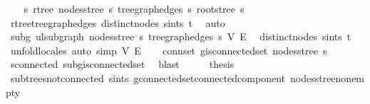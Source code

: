 \begin{isabellebody}
%
\isadelimproof
%
\endisadelimproof
%
\isatagproof
{}\isamarkupfalse%
{\isacharminus}{\kern0pt}\isanewline
\ \ \isamarkupfalse%
\ s{\isacharcolon}{\kern0pt}\ rtree\ {\isachardoublequoteopen}nodes{\isacharunderscore}{\kern0pt}stree\ s{\isachardoublequoteclose}\ {\isachardoublequoteopen}tree{\isacharunderscore}{\kern0pt}graph{\isacharunderscore}{\kern0pt}edges\ s{\isachardoublequoteclose}\ {\isachardoublequoteopen}root{\isacharunderscore}{\kern0pt}stree\ s{\isachardoublequoteclose}\ \isamarkupfalse%
\ rtree{\isacharunderscore}{\kern0pt}tree{\isacharunderscore}{\kern0pt}graph{\isacharunderscore}{\kern0pt}edges\ distinct{\isacharunderscore}{\kern0pt}nodes\ s{\isacharunderscore}{\kern0pt}in{\isacharunderscore}{\kern0pt}ts\ t\ \isamarkupfalse%
\ auto\isanewline
\ \ \isamarkupfalse%
\ subg{\isacharprime}{\kern0pt}{\isacharcolon}{\kern0pt}\ ulsubgraph\ {\isachardoublequoteopen}nodes{\isacharunderscore}{\kern0pt}stree\ s{\isachardoublequoteclose}\ {\isachardoublequoteopen}tree{\isacharunderscore}{\kern0pt}graph{\isacharunderscore}{\kern0pt}edges\ s{\isachardoublequoteclose}\ V{\isacharprime}{\kern0pt}\ E{\isacharprime}{\kern0pt}\ \isamarkupfalse%
\ distinct{\isacharunderscore}{\kern0pt}nodes\ s{\isacharunderscore}{\kern0pt}in{\isacharunderscore}{\kern0pt}ts\ t\ \isamarkupfalse%
\ unfold{\isacharunderscore}{\kern0pt}locales\ {\isacharparenleft}{\kern0pt}auto\ simp{\isacharcolon}{\kern0pt}\ V{\isacharprime}{\kern0pt}\ E{\isacharprime}{\kern0pt}{\isacharparenright}{\kern0pt}\isanewline
\ \ \isamarkupfalse%
\ conn{\isacharunderscore}{\kern0pt}set{\isacharcolon}{\kern0pt}\ {\isachardoublequoteopen}g{\isacharprime}{\kern0pt}{\isachardot}{\kern0pt}is{\isacharunderscore}{\kern0pt}connected{\isacharunderscore}{\kern0pt}set\ {\isacharparenleft}{\kern0pt}nodes{\isacharunderscore}{\kern0pt}stree\ s{\isacharparenright}{\kern0pt}{\isachardoublequoteclose}\ \isamarkupfalse%
\ s{\isachardot}{\kern0pt}connected\ subg{\isacharprime}{\kern0pt}{\isachardot}{\kern0pt}is{\isacharunderscore}{\kern0pt}connected{\isacharunderscore}{\kern0pt}set\ \isamarkupfalse%
\ blast\isanewline
\ \ \isamarkupfalse%
\ \isamarkupfalse%
\ {\isacharquery}{\kern0pt}thesis\ \isamarkupfalse%
\ subtrees{\isacharunderscore}{\kern0pt}not{\isacharunderscore}{\kern0pt}connected\ s{\isacharunderscore}{\kern0pt}in{\isacharunderscore}{\kern0pt}ts\ g{\isacharprime}{\kern0pt}{\isachardot}{\kern0pt}connected{\isacharunderscore}{\kern0pt}set{\isacharunderscore}{\kern0pt}connected{\isacharunderscore}{\kern0pt}component\ nodes{\isacharunderscore}{\kern0pt}stree{\isacharunderscore}{\kern0pt}non{\isacharunderscore}{\kern0pt}empty\ \isamarkupfalse%

\end{isabellebody}
